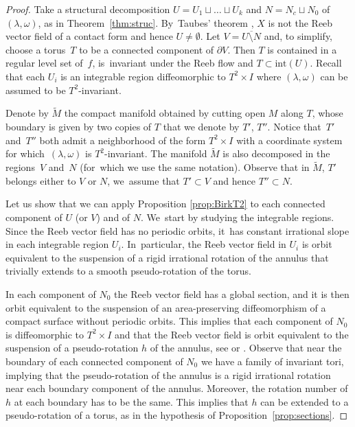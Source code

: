 \documentclass[JEP,XML,SOM,Unicode,NoEqCountersInSection,NoFloatCountersInSection,published]{cedram}
\theoremstyle{definition}
\begin{document}
\begin{proof}
Take a structural decomposition $U=U_1\sqcup \ldots \sqcup U_k$ and $N= N_c \sqcup N_0$ of $(\lambda,\omega)$, as in Theorem~\ref{thm:struc}. By~Taubes' theorem \cite{Taub}, $X$ is not the Reeb vector field of a contact form and hence $U\neq \emptyset$. Let $V=\overline{U\setminus N}$ and, to simplify, choose a torus~$T$ to be a connected component of $\partial V$. Then $T$ is contained in a regular level set of~$f$, is~invariant under the Reeb flow and $T\subset \text{int}(U)$. Recall that each $U_i$ is an integrable region diffeomorphic to $T^2\times I$ where $(\lambda,\omega)$ can be assumed to be $T^2$-invariant.

Denote by $\widetilde{M}$ the compact manifold obtained by cutting open $M$ along $T$, whose boundary is given by two copies of $T$ that we denote by $T'$, $T''$. Notice that~$T'$ and~$T''$ both admit a neighborhood of the form $T^2\times I$ with a coordinate system for which~$(\lambda,\omega)$ is $T^2$-invariant. The manifold $\widetilde M$ is also decomposed in the regions~$V$ and~$N$ (for~which we use the same notation). Observe that in $\widetilde M$, $T'$ belongs either to $V$ or $N$, we~assume that $T'\subset V$ and hence $T''\subset N$.

Let us show that we can apply Proposition \ref{prop:BirkT2} to each connected component of $U$ (or $V$) and of $N$. We~start by studying the integrable regions. Since the Reeb vector field has no periodic orbits, it~has constant irrational slope in each integrable region $U_i$. In~particular, the Reeb vector field in $U_i$ is orbit equivalent to the suspension of a rigid irrational rotation of the annulus that trivially extends to a smooth pseudo-rotation of the torus.

In each component of $N_0$ the Reeb vector field has a global section, and it is then orbit equivalent to the suspension of an area-preserving diffeomorphism of a compact surface without periodic orbits. This implies that each component of $N_0$ is diffeomorphic to $T^2\times I$ and that the Reeb vector field is orbit equivalent to the suspension of a pseudo-rotation $h$ of the annulus, see \cite[p.\,20]{Re} or \cite[\S 5.3]{HT}. Observe that near the boundary of each connected component of $N_0$ we have a family of invariant tori, implying that the pseudo-rotation of the annulus is a rigid irrational rotation near each boundary component of the annulus. Moreover, the rotation number of $h$ at each boundary has to be the same. This implies that $h$ can be extended to a pseudo-rotation of a torus, as in the hypothesis of Proposition~\ref{prop:sections}.


\end{proof}
\end{document}
